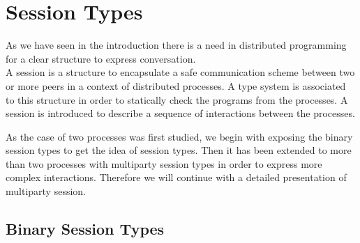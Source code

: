 \documentclass{article}
\begin{document}
\section{Session Types}

As we have seen in the introduction there is a need in distributed programming for a clear structure to express conversation.\\
A session is a structure to encapsulate a safe communication scheme between two or more peers in a context of distributed processes. A type system is associated to this structure in order to statically check the programs from the processes.
A session is introduced to describe a sequence of interactions between the processes.

As the case of two processes was first studied, we begin with exposing the binary session types to get the idea of session types. Then it has been extended to more than two processes with multiparty session types in order to express more complex interactions. Therefore we will continue with a detailed presentation of multiparty session.

\subsection{Binary Session Types}
\end{document}
